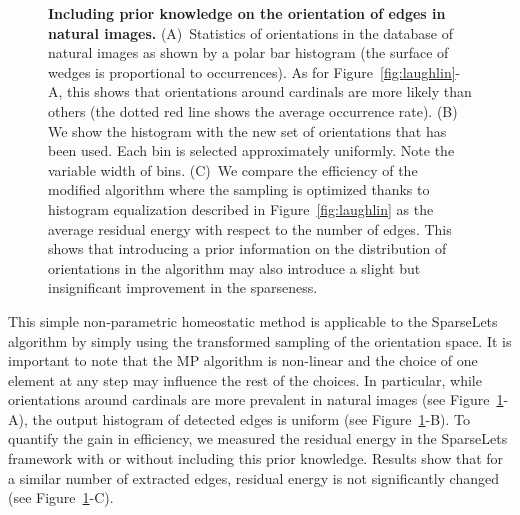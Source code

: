 \documentclass[a4paper, 11pt]{book}
\begin{document}
\begin{figure}
{}
\caption{ {\bf Including prior knowledge on the orientation of edges in natural images.}  \textsf{(A)}~Statistics of orientations in the database of natural images as shown by a polar bar histogram (the surface of wedges is proportional to occurrences). As for Figure~\ref{fig:laughlin}-A, this shows that orientations around cardinals are more likely than others (the dotted red line shows the average occurrence rate). \textsf{(B)}~ We show the histogram with the new set of orientations that has been used. Each bin is selected approximately uniformly. Note the variable width of bins.
\textsf{(C)}~We compare the efficiency of the modified algorithm where the sampling is optimized thanks to histogram equalization described in Figure~\ref{fig:laughlin} as the average residual energy with respect to the number of edges. %
This shows that  introducing a prior information on the distribution of orientations in the algorithm may also introduce a slight but insignificant improvement in the sparseness. %
\label{fig:firstorder}}%
\end{figure}%
This simple non-parametric homeostatic method is applicable to the SparseLets algorithm by simply using the transformed sampling of the orientation space.
It is important to note that the MP algorithm is non-linear and the choice of one element at any step may influence the rest of the choices.
In particular, while orientations around cardinals are more prevalent in natural images (see Figure~\ref{fig:firstorder}-A), the output histogram of detected edges is uniform (see Figure~\ref{fig:firstorder}-B). %
To quantify the gain in efficiency, we measured the residual energy in the SparseLets framework with or without including this prior knowledge. Results show that for a similar number of extracted edges, residual energy is not significantly changed (see Figure~\ref{fig:firstorder}-C).
\end{document}
